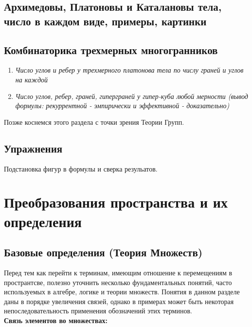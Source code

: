 \documentclass{book}
\begin{document}
\section{Архимедовы, Платоновы и Каталановы тела, число в каждом виде, примеры, картинки}

\section{Комбинаторика трехмерных многогранников}

\begin{enumerate}
\item \textit{Число углов и ребер у трехмерного платонова тела по числу граней и углов на каждой}

\item \textit{Число углов, ребер, граней, гиперграней у гипер-куба любой мерности (вывод формулы: рекуррентной - эмпирически и эффективной - доказательно)} 
\end{enumerate}

Позже коснемся этого раздела с точки зрения Теории Групп.

\section{Упражнения}

Подстановка фигур в формулы и сверка резульатов.

\chapter{Преобразования пространства и их определения}

\section{Базовые определения (Теория Множеств)}


Перед тем как перейти к терминам, имеющим отношение к перемещениям в пространтсве, полезно уточнить несколько фундаментальных понятий, часто используемых в алгебре, логике и теории множеств. Понятия в данном разделе даны в порядке увеличения связей, однако в примерах может быть некоторая непоследовательность применения обозначений этих терминов.\\

\textbf{Связь элементов во множествах:}
\end{document}
